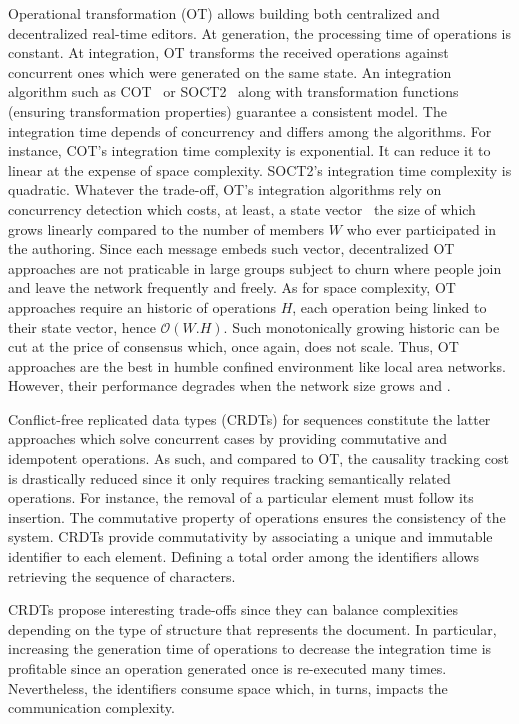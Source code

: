 \begin{asparadesc}
\item [Operational transformation] (OT) allows building both centralized and
  decentralized real-time editors. At generation, the processing time of
  operations is constant. At integration, OT transforms the received operations
  against concurrent ones which were generated on the same state. An integration
  algorithm such as COT~\cite{sun2009contextbased} or
  SOCT2~\cite{vidot2000copies} along with transformation functions (ensuring
  transformation properties) guarantee a consistent model. The integration time
  depends of concurrency and differs among the algorithms.  For instance, COT's
  integration time complexity is exponential. It can reduce it to linear at the
  expense of space complexity. SOCT2's integration time complexity is quadratic.
  Whatever the trade-off, OT's integration algorithms rely on concurrency
  detection which costs, at least, a state
  vector~\cite{charronbost1991concerning} the size of which grows linearly
  compared to the number of members $W$ who ever participated in the
  authoring. Since each message embeds such vector, decentralized OT approaches
  are not praticable in large groups subject to churn where people join and
  leave the network frequently and freely.  As for space complexity, OT
  approaches require an historic of operations $H$, each operation being linked
  to their state vector, hence $\mathcal{O}(W.H)$. Such monotonically growing
  historic can be cut at the price of consensus which, once again, does not
  scale. Thus, OT approaches are the best in humble confined environment like
  local area networks. However, their performance degrades when the network size
  grows and .

\item [Conflict-free replicated data types] (CRDTs) for sequences constitute the
  latter approaches which solve concurrent cases by providing commutative and
  idempotent operations. As such, and compared to OT, the causality tracking
  cost is drastically reduced since it only requires tracking semantically
  related operations. For instance, the removal of a particular element must
  follow its insertion. The commutative property of operations ensures the
  consistency of the system. CRDTs provide commutativity by associating a unique
  and immutable identifier to each element. Defining a total order among the
  identifiers allows retrieving the sequence of characters. 

  CRDTs propose interesting trade-offs since they can balance complexities
  depending on the type of structure that represents the document.  In
  particular, increasing the generation time of operations to decrease the
  integration time is profitable since an operation generated once is
  re-executed many times. Nevertheless, the identifiers consume space which, in
  turns, impacts the communication complexity.


\end{asparadesc}
